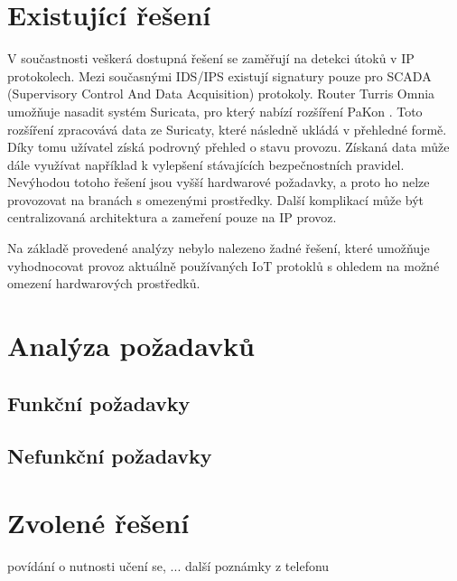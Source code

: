 \section{Existující řešení}
 V součastnosti veškerá dostupná řešení se zaměřují na detekci útoků v IP protokolech. Mezi 
 současnými IDS/IPS existují signatury pouze pro SCADA (Supervisory Control And Data Acquisition)
 protokoly. Router Turris Omnia umožňuje nasadit systém Suricata, pro který nabízí rozšíření 
 PaKon \cite{pakon}. Toto rozšíření zpracovává data ze Suricaty, které následně ukládá v přehledné formě.
 Díky tomu užívatel získá podrovný přehled o stavu provozu. Získaná data může dále využívat 
 například k vylepšení stávajících bezpečnostních pravidel. Nevýhodou totoho řešení jsou 
 vyšší hardwarové požadavky, a proto ho nelze provozovat na branách s omezenými 
 prostředky. Další komplikací může být centralizovaná architektura a zameření pouze na 
 IP provoz.
 
 Na základě provedené analýzy nebylo nalezeno žadné řešení, které umožňuje vyhodnocovat 
 provoz aktuálně používaných IoT protoklů s ohledem na možné omezení hardwarových
 prostředků.
 
 \newpage
 \section{Analýza požadavků}
 
  \subsection{Funkční požadavky}
  \subsection{Nefunkční požadavky}
  
 \newpage 
 \section{Zvolené řešení}
 povídání o nutnosti učení se, ... další poznámky z telefonu
